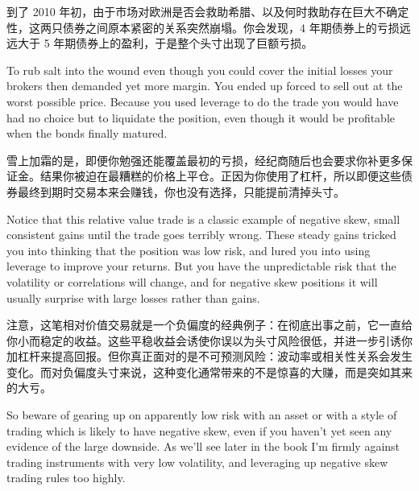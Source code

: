 \begin{chineseblock}到了 2010 年初，由于市场对欧洲是否会救助希腊、以及何时救助存在巨大不确定性，这两只债券之间原本紧密的关系突然崩塌。你会发现，4 年期债券上的亏损远远大于 5 年期债券上的盈利，于是整个头寸出现了巨额亏损。\end{chineseblock}

\bipairgap

\begin{englishblock} To rub salt into the wound even though you could cover the initial losses your brokers then demanded yet more margin. You ended up forced to sell out at the worst possible price. Because you used leverage to do the trade you would have had no choice but to liquidate the position, even though it would be profitable when the bonds finally matured. \end{englishblock}

\begin{chineseblock}雪上加霜的是，即便你勉强还能覆盖最初的亏损，经纪商随后也会要求你补更多保证金。结果你被迫在最糟糕的价格上平仓。正因为你使用了杠杆，所以即便这些债券最终到期时交易本来会赚钱，你也没有选择，只能提前清掉头寸。\end{chineseblock}

\bipairgap

\begin{englishblock} Notice that this relative value trade is a classic example of negative skew, small consistent gains until the trade goes terribly wrong. These steady gains tricked you into thinking that the position was low risk, and lured you into using leverage to improve your returns. But you have the unpredictable risk that the volatility or correlations will change, and for negative skew positions it will usually surprise with large losses rather than gains. \end{englishblock}

\begin{chineseblock}注意，这笔相对价值交易就是一个负偏度的经典例子：在彻底出事之前，它一直给你小而稳定的收益。这些平稳收益会诱使你误以为头寸风险很低，并进一步引诱你加杠杆来提高回报。但你真正面对的是不可预测风险：波动率或相关性关系会发生变化。而对负偏度头寸来说，这种变化通常带来的不是惊喜的大赚，而是突如其来的大亏。\end{chineseblock}

\bipairgap

\begin{englishblock} So beware of gearing up on apparently low risk with an asset or with a style of trading which is likely to have negative skew, even if you haven't yet seen any evidence of the large downside. As we'll see later in the book I'm firmly against trading instruments with very low volatility, and leveraging up negative skew trading rules too highly. \end{englishblock}

